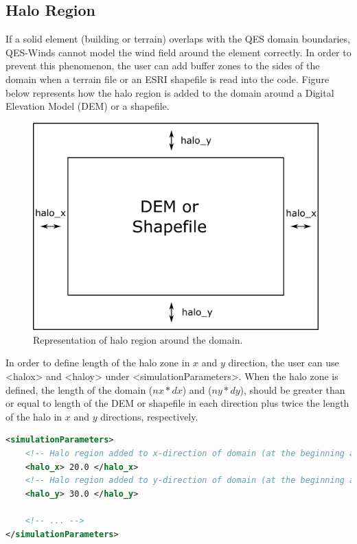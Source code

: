\subsection{Halo Region}

If a solid element (building or terrain) overlaps with the QES domain boundaries, QES-Winds cannot model the wind field around the element correctly. In order to prevent this phenomenon, the user can add buffer zones to the sides of the domain when a terrain file or an ESRI shapefile is read into the code. Figure below represents how the halo region is added to the domain around a Digital Elevation Model (DEM) or a shapefile.

\begin{figure}[h!]
\centering
\includegraphics[width=11.0cm,keepaspectratio]{Images/domain_halo.png}
\caption{Representation of halo region around the domain.}
\end{figure}

In order to define length of the halo zone in $x$ and $y$ direction, the user can use <halo\textunderscore x> and <halo\textunderscore y> under <simulationParameters>. When the halo zone is defined, the length of the domain ($nx*dx$) and ($ny*dy$), should be greater than or equal to length of the DEM or shapefile in each direction plus twice the length of the halo in $x$ and $y$ directions, respectively.

\begin{lstlisting}[language=XML]
<simulationParameters>
	<!-- Halo region added to x-direction of domain (at the beginning and the end of domain) (meters)-->
	<halo_x> 20.0 </halo_x>
	<!-- Halo region added to y-direction of domain (at the beginning and the end of domain) (meters)-->
	<halo_y> 30.0 </halo_y>
	
	<!-- ... -->
</simulationParameters>
\end{lstlisting}


